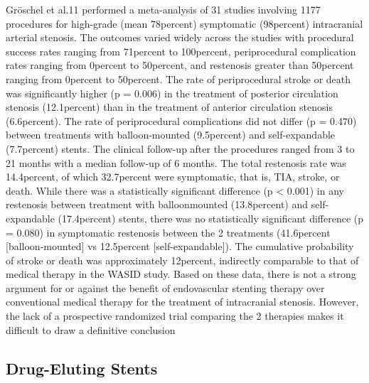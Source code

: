 \documentclass{article}
\begin{document}
Gröschel et al.11 performed a meta-analysis of 31 
studies involving 1177 procedures for high-grade (mean 
78percent) symptomatic (98percent) intracranial arterial stenosis. 
The outcomes varied widely across the studies with procedural success rates ranging from 71percent to 100percent, periprocedural complication rates ranging from 0percent to 50percent, 
and restenosis greater than 50percent ranging from 0percent to 50percent. 
The rate of periprocedural stroke or death was significantly higher (p = 0.006) in the treatment of posterior circulation stenosis (12.1percent) than in the treatment of anterior 
circulation stenosis (6.6percent). The rate of periprocedural 
complications did not differ (p = 0.470) between treatments with balloon-mounted (9.5percent) and self-expandable 
(7.7percent) stents. The clinical follow-up after the procedures 
ranged from 3 to 21 months with a median follow-up of 
6 months. The total restenosis rate was 14.4percent, of which 
32.7percent were symptomatic, that is, TIA, stroke, or death. 
While there was a statistically significant difference (p < 
0.001) in any restenosis between treatment with balloonmounted (13.8percent) and self-expandable (17.4percent) stents, there 
was no statistically significant difference (p = 0.080) in 
symptomatic restenosis between the 2 treatments (41.6percent 
[balloon-mounted] vs 12.5percent [self-expandable]). The cumulative probability of stroke or death was approximately 
12percent, indirectly comparable to that of medical therapy 
in the WASID study. Based on these data, there is not a 
strong argument for or against the benefit of endovascular 
stenting therapy over conventional medical therapy for 
the treatment of intracranial stenosis. However, the lack 
of a prospective randomized trial comparing the 2 therapies makes it difficult to draw a definitive conclusion







\subsection{Drug-Eluting Stents}
\end{document}
